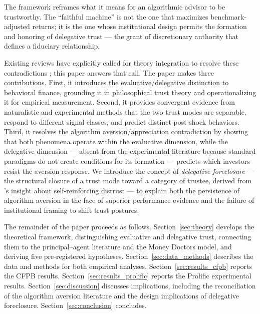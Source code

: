 The framework reframes what it means for an algorithmic advisor to be trustworthy. The ``faithful machine'' is not the one that maximizes benchmark-adjusted returns; it is the one whose institutional design permits the formation and honoring of delegative trust --- the grant of discretionary authority that defines a fiduciary relationship.

Existing reviews have explicitly called for theory integration to resolve these contradictions \citep{BurtonSteinJensen2020, JussupowBenbasatHeinzl2024}; this paper answers that call. The paper makes three contributions. First, it introduces the evaluative/delegative distinction to behavioral finance, grounding it in philosophical trust theory and operationalizing it for empirical measurement. Second, it provides convergent evidence from naturalistic and experimental methods that the two trust modes are separable, respond to different signal classes, and predict distinct post-shock behaviors. Third, it resolves the algorithm aversion/appreciation contradiction by showing that both phenomena operate within the evaluative dimension, while the delegative dimension --- absent from the experimental literature because standard paradigms do not create conditions for its formation --- predicts which investors resist the aversion response. We introduce the concept of \textit{delegative foreclosure} --- the structural closure of a trust mode toward a category of trustee, derived from \citeauthor{hardin1993street}'s insight about self-reinforcing distrust --- to explain both the persistence of algorithm aversion in the face of superior performance evidence and the failure of institutional framing to shift trust postures.

The remainder of the paper proceeds as follows. Section~\ref{sec:theory} develops the theoretical framework, distinguishing evaluative and delegative trust, connecting them to the principal--agent literature and the Money Doctors model, and deriving five pre-registered hypotheses. Section~\ref{sec:data_methods} describes the data and methods for both empirical analyses. Section~\ref{sec:results_cfpb} reports the CFPB results. Section~\ref{sec:results_prolific} reports the Prolific experimental results. Section~\ref{sec:discussion} discusses implications, including the reconciliation of the algorithm aversion literature and the design implications of delegative foreclosure. Section~\ref{sec:conclusion} concludes.
